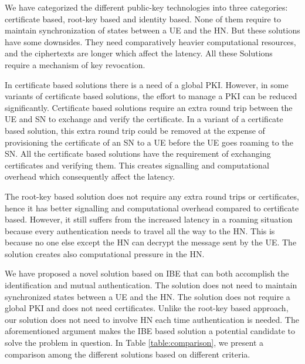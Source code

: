 \documentclass{river-journal}
\begin{document}
We have categorized the different public-key technologies into three categories: certificate based, root-key based and identity based. None of them require to maintain synchronization of states between a UE and the HN. But these solutions have some downsides. They need comparatively heavier computational resources, and the ciphertexts are longer which affect the latency. All these Solutions require a mechanism of key revocation.

In certificate based solutions there is a need of a global PKI. However, in some variants of certificate based solutions, the effort to manage a PKI can be reduced significantly. Certificate based solutions require an extra round trip between the UE and SN to exchange and verify the certificate. In a variant of a certificate based solution, this extra round trip could be removed at the expense of provisioning the certificate of an SN to a UE before the UE goes roaming to the SN. All the certificate based solutions have the requirement of exchanging certificates and verifying them. This creates signalling and computational overhead which consequently affect the latency. 

The root-key based solution does not require any extra round trips or certificates, hence it has better signalling and computational overhead compared to certificate based. However, it still suffers from the increased latency in a roaming situation because every authentication needs to travel all the way to the HN. This is because no one else except the HN can decrypt the message sent by the UE. The solution creates also computational pressure in the HN. 

We have proposed a novel solution based on IBE that can both accomplish the identification and mutual authentication. The solution does not need to maintain synchronized states between a UE and the HN. The solution does not require a global PKI and does not need certificates. Unlike the root-key based approach, our solution does not need to involve HN each time authentication is needed. The aforementioned argument makes the IBE based solution a potential candidate to solve the problem in question. In Table \ref{table:comparison}, we present a comparison among the different solutions based on different criteria.
\end{document}
